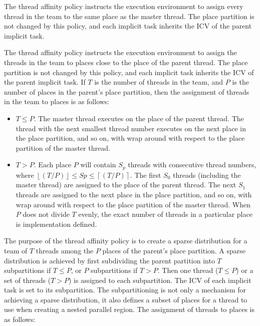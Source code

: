 The  thread affinity policy instructs the execution environment to assign every thread in the team to the same place as the master thread. The place partition is not changed by this policy, and each implicit task inherits the  ICV of the parent implicit task.

The  thread affinity policy instructs the execution environment to assign the threads in the team to places close to the place of the parent thread. The place partition is not changed by this policy, and each implicit task inherits the  ICV of the parent implicit task. If $T$ is the number of threads in the team, and $P$ is the number of places in the parent's place partition, then the assignment of threads in the team to places is as follows:

\begin{itemize}
\item $T\leq P$.
The master thread executes on the place of the parent thread. The thread with the next smallest thread number executes on the next place in the place partition, and so on, with wrap around with respect to the place partition of the master thread.
\item $T>P$.
Each place $P$ will contain $S_{p}$ threads with consecutive thread numbers, 
where $\left \lfloor{(T/P)}\right \rfloor\leq Sp \leq \left \lceil{(T/P)}\right \rceil$. The first $S_{0}$ threads (including the master thread) are assigned to the place of the parent thread. The next $S_{1}$ threads are assigned to the next place in the place partition, and so on, with wrap around with respect to the place partition of the master thread. When $P$ does not divide $T$ evenly, the exact number of threads in a particular place is implementation defined.
\end{itemize}


The purpose of the  thread affinity policy is to create a sparse distribution for a 
team of $T$ threads among the $P$ places of the parent's place partition. A sparse distribution is achieved 
by first subdividing the parent partition into $T$ subpartitions if 
$T\leq P$, or $P$ subpartitions if $T>P$. Then one thread ($T\leq P$) or a 
set of threads ($T>P$) is assigned to each subpartition. The 
 ICV of each implicit task is set to its subpartition.
The subpartitioning is not only a mechanism for achieving a sparse 
distribution, it also defines a subset of places for a thread to use when 
creating a nested parallel region. The assignment of threads to places is as 
follows:

